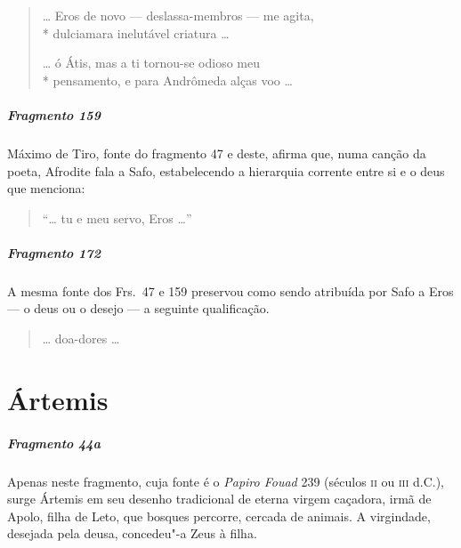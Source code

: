 \begin{verse}
\ldots{} Eros de novo --- deslassa-membros --- me \qb{}agita,\\*
dulciamara inelutável criatura \ldots{}

\ldots{} ó Átis, mas a ti tornou-se odioso meu\\*
pensamento, e para Andrômeda alças voo \ldots{}
\end{verse}

\paragraph{Fragmento 159}

{\small Máximo de Tiro, fonte do fragmento 47 e deste, afirma que, numa canção da poeta,
Afrodite fala a Safo, estabelecendo a hierarquia corrente entre si e o deus que
menciona:}

\begin{verse}
“\ldots{} tu e meu servo, Eros \ldots{}”
\end{verse}

\pagebreak

\paragraph{Fragmento 172}

{\small A mesma fonte dos Frs.~47 e 159 preservou como sendo atribuída por Safo a Eros --- o deus ou o desejo --- a seguinte qualificação.}

\begin{verse}
\ldots{} doa-dores \ldots{} 
\end{verse}

\chapter{Ártemis}

\paragraph{Fragmento 44a}

{\small Apenas neste fragmento, cuja fonte é o \textit{Papiro Fouad }239 (séculos \textsc{ii} ou
\textsc{iii} d.C.), surge Ártemis em seu desenho tradicional de eterna virgem caçadora,
irmã de Apolo, filha de Leto, que bosques percorre, cercada de animais. A
virgindade, desejada pela deusa, concedeu"-a Zeus à filha.}


